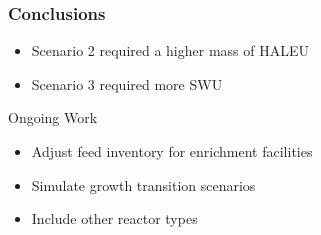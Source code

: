 \begin{frame}
\frametitle{Conclusions}
    \begin{itemize}
        \item Scenario 2 required a higher mass of \gls{HALEU}
        \item Scenario 3 required more \gls{SWU}
    \end{itemize}

    \begin{block}{Ongoing Work}
        \begin{itemize}
            \item Adjust feed inventory for enrichment facilities
            \item Simulate growth transition scenarios
            \item Include other reactor types
        \end{itemize}
        
    \end{block}
    

\end{frame}
